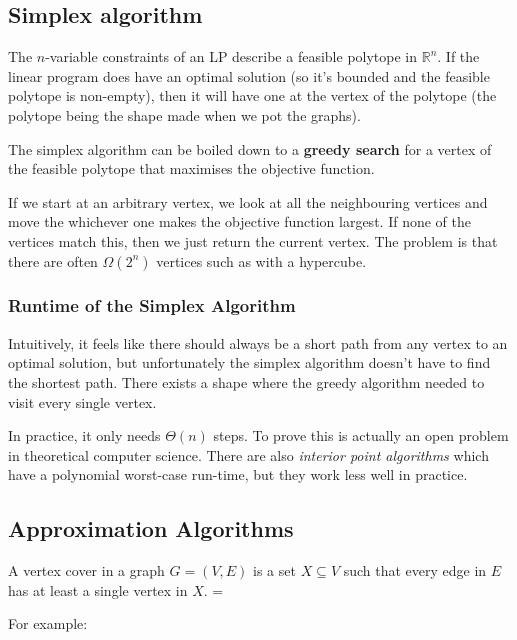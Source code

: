 \documentclass[11pt,a4paper,titlepage,dvipsnames,cmyk]{scrartcl}
\begin{document}
\subsection{Simplex algorithm}%
\label{sub:simplex-alg}
The $n$-variable constraints of an LP describe a feasible polytope in
$\mathbb{R}^n$. If the linear program does have an optimal solution (so
it's bounded and the feasible polytope is non-empty), then it will have
one at the vertex of the polytope (the polytope being the shape made when
we pot the graphs).

The simplex algorithm can be boiled down to a \textbf{greedy search} for a
vertex of the feasible polytope that maximises the objective function.

If we start at an arbitrary vertex, we look at all the neighbouring
vertices and move the whichever one makes the objective function largest.
If none of the vertices match this, then we just return the current
vertex. The problem is that there are often $\Omega(2^n)$ vertices such as
with a hypercube.

\subsubsection{Runtime of the Simplex Algorithm}%
\label{ssub:runtime-simplex}
Intuitively, it feels like there should always be a short path from any
vertex to an optimal solution, but unfortunately the simplex algorithm
doesn't have to find the shortest path. There exists a shape where the
greedy algorithm needed to visit every single vertex.

In practice, it only needs $\Theta(n)$ steps. To prove this is actually an
open problem in theoretical computer science. There are also
\textit{interior point algorithms} which have a polynomial worst-case
run-time, but they work less well in practice.

\subsection{Approximation Algorithms}%
\label{sub:aprox-algorithms}
A vertex cover in a graph $G=(V,E)$ is a set $X \subseteq V$ such that
every edge in $E$ has at least a single vertex in $X$. =

For example:
\end{document}
